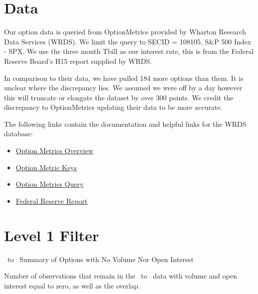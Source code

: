 \begin{appendix}


\section{Data}\label{app:data}

Our option data is queried from OptionMetrics provided by Wharton Research Data Services (WRDS). We limit the query to SECID = 108105, S\&P 500 Index - SPX. We use the three month Tbill as our interest rate, this is from the Federal Reserve Board's H15 report supplied by WRDS. 

In comparison to their data, we have pulled 184 more options than them. It is unclear where the discrepancy lies. We assumed we were off by a day however this will truncate or elongate the dataset by over 300 points. We credit the discrepancy to OptionMetrics updating their data to be more accurate. 

The following links contain the documentation and helpful links for the WRDS database: 
\begin{itemize}
\item \href{https://wrds-www.wharton.upenn.edu/pages/support/manuals-and-overviews/optionmetrics/wrds-overview-optionmetrics/}{Option Metrics Overview} 
\item \href{https://wrds-www.wharton.upenn.edu/data-dictionary/optionm_all/opprcd2023/ }{Option Metric Keys}
\item \href{https://wrds-www.wharton.upenn.edu/pages/get-data/optionmetrics/ivy-db-us/options/option-prices/}{Option Metrics Query} 
\item \href{https://wrds-www.wharton.upenn.edu/data-dictionary/frb_all/rates_daily/}{Federal Reserve Report} 
\end{itemize}



\newpage

\section{Level 1 Filter}\label{app:lvl1}


\begin{table}[ht]

\centering
{}
\caption{\STARTONE\ to \ENDONE\ Summary of Options with No Volume Nor Open Interest}



\caption*{
  Number of observations that remain in the \STARTONE\ to \ENDONE\ data with volume and open interest equal to zero, as well as the overlap. 
}
\label{table:time1lvl1T1}
\end{table}



\end{appendix}
